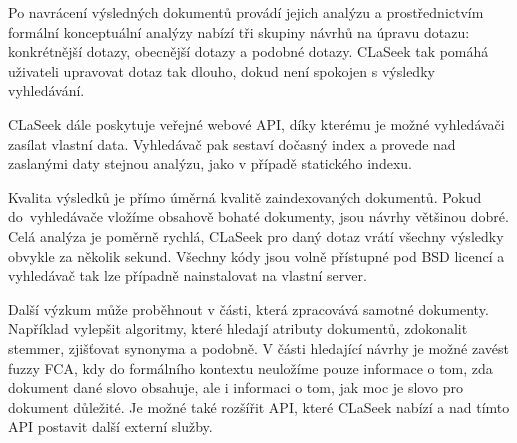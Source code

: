 \documentclass{article}
\newcommand{\name}{CLaSeek}
\begin{document}
Po navrácení výsledných dokumentů provádí jejich analýzu a prostřednictvím formální konceptuální analýzy nabízí tři skupiny návrhů na úpravu dotazu: konkrétnější dotazy, obecnější dotazy a podobné dotazy. \name{} tak pomáhá uživateli upravovat dotaz tak dlouho, dokud není spokojen s výsledky vyhledávání. 

\name{} dále poskytuje veřejné webové API, díky kterému je možné vyhledávači zasílat vlastní data. Vyhledávač pak sestaví dočasný index a provede nad zaslanými daty stejnou analýzu, jako v případě statického indexu. 

Kvalita výsledků je přímo úměrná kvalitě zaindexovaných dokumentů. Pokud do~vyhledávače vložíme obsahově bohaté dokumenty, jsou návrhy většinou dobré. Celá analýza je poměrně rychlá, \name{} pro daný dotaz vrátí všechny výsledky obvykle za několik sekund. Všechny kódy jsou volně přístupné pod BSD licencí a vyhledávač tak lze případně nainstalovat na vlastní server. 

Další výzkum může proběhnout v části, která zpracovává samotné dokumenty. Například vylepšit algoritmy, které hledají atributy dokumentů, zdokonalit stemmer, zjišťovat synonyma a podobně. V části hledající návrhy je možné zavést fuzzy FCA, kdy do formálního kontextu neuložíme pouze informace o tom, zda dokument dané slovo obsahuje, ale i informaci o tom, jak moc je slovo pro dokument důležité. Je možné také rozšířit API, které \name{} nabízí a nad tímto API postavit další externí služby.

\newpage


\end{document}
